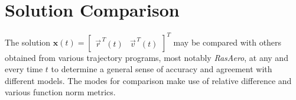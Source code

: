 \documentclass[11pt]{thesis}
\numberwithin{equation}{section}
\begin{document}
%
%

\section{Solution Comparison}
The solution $\mathbf{x}(t) = \begin{bmatrix}{\vec{r}}^{\,T}(t) & {\vec{v}}^{\,T}(t)\end{bmatrix}^T$ may be compared with others obtained from various trajectory programs, most notably \textsl{RasAero}, at any and every time $t$ to determine a general sense of accuracy and agreement with different models. The modes for comparison make use of relative difference and various function norm metrics.
\end{document}
